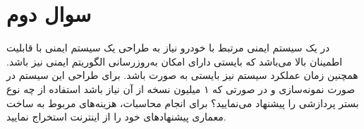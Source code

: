 \section{سوال دوم}
در یک سیستم ایمنی مرتبط با خودرو نیاز به طراحی یک سیستم ایمنی با قابلیت اطمینان بالا می‌باشد که بایستی دارای امکان به‌روزرسانی الگوریتم ایمنی نیز باشد. همچنین زمان عملکرد سیستم نیز بایستی به صورت  باشد. برای طراحی این سیستم در صورت نمونه‌سازی و در صورتی که ۱ میلیون نسخه از آن نیاز باشد استفاده از چه نوع بستر پردازشی را پیشنهاد می‌نمایید؟ برای انجام محاسبات، هزینه‌های مربوط به ساخت معماری پیشنهادهای خود را از اینترنت استخراج نمایید.

\begin{qsolve}
	
\end{qsolve}